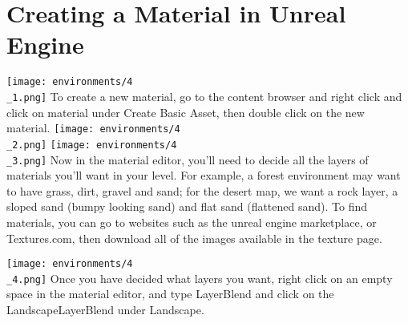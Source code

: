 \documentclass[../main.tex]{subfiles}
\begin{document}
\section{Creating a Material in Unreal Engine}
\texttt{[image: environments/4\\\_1.png]}
To create a new material, go to the content browser and right click and click on material under Create Basic Asset, then double click on the new material.
\texttt{[image: environments/4\\\_2.png]}
\texttt{[image: environments/4\\\_3.png]}
Now in the material editor, you’ll need to decide all the layers of materials you’ll want in your level. For example, a forest environment may want to have grass, dirt, gravel and sand; for the desert map, we want a rock layer, a sloped sand (bumpy looking sand) and flat sand (flattened sand).
To find materials, you can go to websites such as the unreal engine marketplace, or Textures.com, then download all of the images available in the texture page.

\texttt{[image: environments/4\\\_4.png]}
Once you have decided what layers you want, right click on an empty space in the material editor, and type LayerBlend and click on the LandscapeLayerBlend under Landscape.
\end{document}
